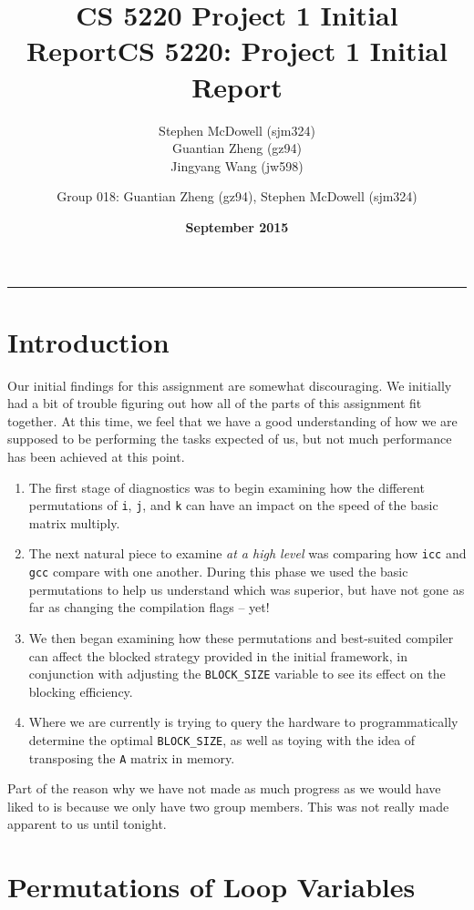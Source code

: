 \documentclass[11pt]{article}
\title{\textbf{CS 5220 Project 1 Initial Report}}
\author{Stephen McDowell (sjm324)\\ Guantian Zheng (gz94)\\ Jingyang Wang (jw598)}
\date{\textbf{September 2015}}
\title{CS 5220: Project 1 Initial Report}
\author{Group 018: Guantian Zheng (gz94), Stephen McDowell (sjm324)}
\makeatletter
\renewcommand{\maketitle}{\bgroup\setlength{\parindent}{0pt}
\begin{flushleft}
  {\Large \textsc{\@title}}\newline
  \textsc{\@author}
  \rule{\textwidth}{1pt}
\end{flushleft}\egroup
}
\makeatother
\begin{document}
\thispagestyle{empty}
\maketitle

\section{Introduction}

Our initial findings for this assignment are somewhat discouraging.  We initially had a bit of trouble figuring out how all of the parts of this assignment fit together.  At this time, we feel that we have a good understanding of how we are supposed to be performing the tasks expected of us, but not much performance has been achieved at this point.

\begin{enumerate}
    \item The first stage of diagnostics was to begin examining how the different permutations of \texttt{i}, \texttt{j}, and \texttt{k} can have an impact on the speed of the basic matrix multiply.

    \item The next natural piece to examine \emph{at a high level} was comparing how \texttt{icc} and \texttt{gcc} compare with one another.  During this phase we used the basic permutations to help us understand which was superior, but have not gone as far as changing the compilation flags -- yet!

    \item We then began examining how these permutations and best-suited compiler can affect the blocked strategy provided in the initial framework, in conjunction with adjusting the \texttt{BLOCK\_SIZE} variable to see its effect on the blocking efficiency.

    \item Where we are currently is trying to query the hardware to programmatically determine the optimal \texttt{BLOCK\_SIZE}, as well as toying with the idea of transposing the \texttt{A} matrix in memory.
\end{enumerate}

\noindent Part of the reason why we have not made as much progress as we would have liked to is because we only have two group members.  This was not really made apparent to us until tonight.

\section{Permutations of Loop Variables}
\end{document}
